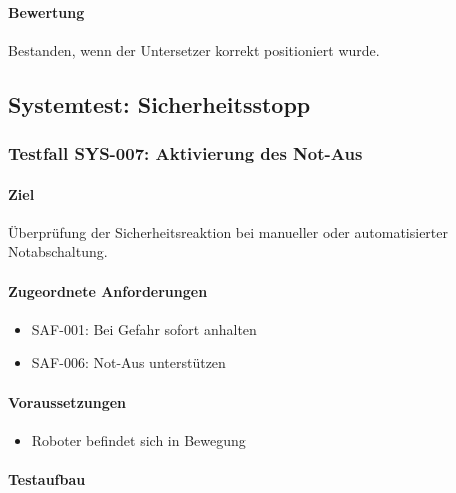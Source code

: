 \paragraph{Bewertung}\label{bewertung-29}

Bestanden, wenn der Untersetzer korrekt positioniert wurde.

\subsection{Systemtest:
Sicherheitsstopp}\label{systemtest-sicherheitsstopp}

\subsubsection{Testfall SYS-007: Aktivierung des
Not-Aus}\label{testfall-sys-007-aktivierung-des-not-aus}

\paragraph{Ziel}\label{ziel-30}

Überprüfung der Sicherheitsreaktion bei manueller oder automatisierter
Notabschaltung.

\paragraph{Zugeordnete
Anforderungen}\label{zugeordnete-anforderungen-30}

\begin{itemize}
\tightlist
\item
  SAF-001: Bei Gefahr sofort anhalten
\item
  SAF-006: Not-Aus unterstützen
\end{itemize}

\paragraph{Voraussetzungen}\label{voraussetzungen-29}

\begin{itemize}
\tightlist
\item
  Roboter befindet sich in Bewegung
\end{itemize}

\paragraph{Testaufbau}\label{testaufbau-6}

